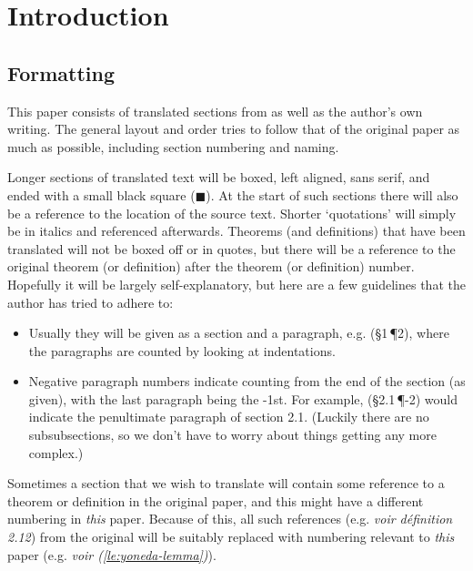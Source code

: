 
\section{Introduction} %
\label{sec:introduction}

    \subsection{Formatting} %
    \label{ssub:formatting}

        This paper consists of translated sections from \cite{Toen:2005wxa} as well as the author's own writing.
        The general layout and order tries to follow that of the original paper as much as possible, including section numbering and naming.

        Longer sections of translated text will be boxed, left aligned, sans serif, and ended with a small black square ($\blacksquare$).
        At the start of such sections there will also be a reference to the location of the source text.
        Shorter `quotations' will simply be in italics and referenced afterwards.
        Theorems (and definitions) that have been translated will not be boxed off or in quotes, but there will be a reference to the original theorem (or definition) after the theorem (or definition) number.
        Hopefully it will be largely self-explanatory, but here are a few guidelines that the author has tried to adhere to:
        \begin{itemize}
            \item Usually they will be given as a section and a paragraph, e.g. (\S1\,\P2), where the paragraphs are counted by looking at indentations.
            \item Negative paragraph numbers indicate counting from the end of the section (as given), with the last paragraph being the -1st.
                For example, (\S2.1\,\P-2) would indicate the penultimate paragraph of section 2.1.
                (Luckily there are no subsubsections, so we don't have to worry about things getting any more complex.)
        \end{itemize}


        Sometimes a section that we wish to translate will contain some reference to a theorem or definition in the original paper, and this might have a different numbering in \emph{this} paper.
        Because of this, all such references (e.g. \emph{voir définition 2.12}) from the original will be suitably replaced with numbering relevant to \emph{this} paper (e.g. \emph{voir \elide (\cref{le:yoneda-lemma})}).

